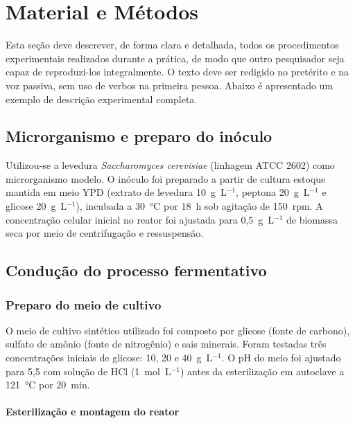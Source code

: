 
\section{Material e Métodos}

Esta seção deve descrever, de forma clara e detalhada, todos os procedimentos experimentais realizados durante a prática, de modo que outro pesquisador seja capaz de reproduzi-los integralmente. O texto deve ser redigido no pretérito e na voz passiva, sem uso de verbos na primeira pessoa. Abaixo é apresentado um exemplo de descrição experimental completa.

\subsection{Microrganismo e preparo do inóculo}

Utilizou-se a levedura \textit{Saccharomyces cerevisiae} (linhagem ATCC 2602) como microrganismo modelo. O inóculo foi preparado a partir de cultura estoque mantida em meio YPD (extrato de levedura 10~g~L$^{-1}$, peptona 20~g~L$^{-1}$ e glicose 20~g~L$^{-1}$), incubada a 30~°C por 18~h sob agitação de 150~rpm. A concentração celular inicial no reator foi ajustada para 0,5~g~L$^{-1}$ de biomassa seca por meio de centrifugação e ressuspensão.

\subsection{Condução do processo fermentativo}

\subsubsection{Preparo do meio de cultivo}

O meio de cultivo sintético utilizado foi composto por glicose (fonte de carbono), sulfato de amônio (fonte de nitrogênio) e sais minerais. Foram testadas três concentrações iniciais de glicose: 10, 20 e 40~g~L$^{-1}$. O pH do meio foi ajustado para 5,5 com solução de HCl (1~mol~L$^{-1}$) antes da esterilização em autoclave a 121~°C por 20~min.

\paragraph{Esterilização e montagem do reator}

